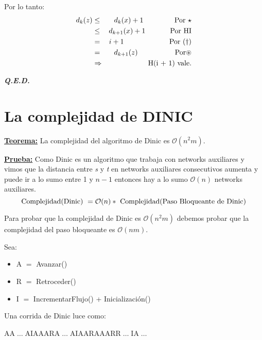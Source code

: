 \documentclass[12pt,a4paper]{report}
\newcommand{\QED}{\hfill \textit{\textbf{Q.E.D.}}}
\begin{document}
\begin{enumerate}
				\par Por lo tanto:
				\begin{eqnarray}
					\nonumber d_{k}(z) &\leq & d_{k}(x) + 1 \qquad \qquad \textup{ Por } \star \\
					\nonumber &\leq & d_{k + 1}(x) + 1 \qquad \; \; \; \; \textup{ Por HI} \\
					\nonumber &=& i + 1 \qquad \qquad \qquad \textup{ Por } (\dag) \\
					\nonumber &=& d_{k + 1}(z) \qquad \qquad \; \; \; \textup{ Por} \circledast \\
					\nonumber & \Rightarrow & \textup{H(i + 1) vale.}
				\end{eqnarray}
			\end{enumerate}

		\QED

	\pagebreak
	\section{La complejidad de DINIC}
		\textbf{\underline{Teorema:}} La complejidad del algoritmo de Dinic es $\mathcal{O}(n^{2}m)$.

		\textbf{\underline{Prueba:}} Como Dinic es un algoritmo que trabaja con networks auxiliares y vimos que la distancia entre \textit{s} y \textit{t} en networks auxiliares consecutivos aumenta y puede ir a lo sumo entre 1 y $n - 1$ entonces hay a lo sumo $\mathcal{O}(n)$ networks auxiliares.
			\[ \textup{Complejidad(Dinic) } = \mathcal{O}(n) * \textup{ Complejidad(Paso Bloqueante de Dinic)} \]
			\par Para probar que la complejidad de Dinic es $\mathcal{O}(n^{2}m)$ debemos probar que la complejidad del paso bloqueante es $\mathcal{O}(nm)$.
			\vspace{3mm}
			\par Sea:
			\begin{itemize}
				\item A $=$ Avanzar()
				\item R $=$ Retroceder()
				\item I $=$ IncrementarFlujo() + Inicialización()
			\end{itemize}

			\par Una corrida de Dinic luce como:
			\begin{center}
				AA$\; \dotsc \;$AIAAARA$\; \dotsc \;$AIAARAAARR$\; \dotsc \;$IA$\; \dotsc \;$
			\end{center}
\end{document}
